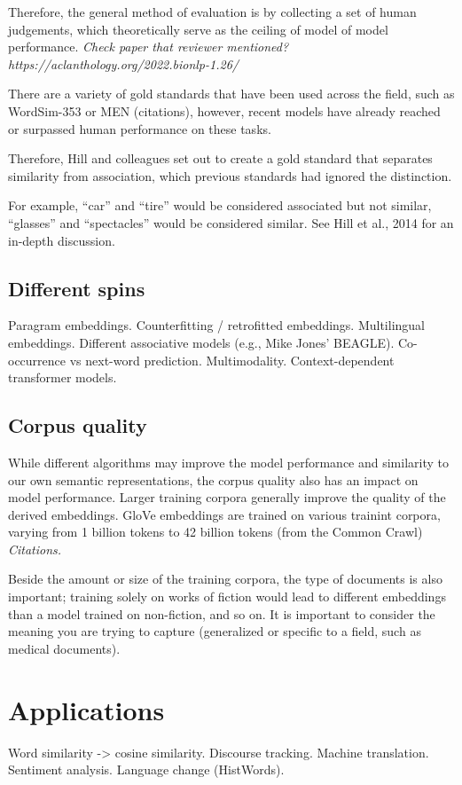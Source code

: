 Therefore, the general method of evaluation is by collecting a set of human judgements, which theoretically serve as the ceiling of model of model performance. \textit{Check paper that reviewer mentioned? https://aclanthology.org/2022.bionlp-1.26/}

There are a variety of gold standards that have been used across the field, such as WordSim-353 or MEN (citations), however, recent models have already reached or surpassed human performance on these tasks.

Therefore, Hill and colleagues set out to create a gold standard that separates similarity from association, which previous standards had ignored the distinction.

For example, ``car'' and ``tire'' would be considered associated but not similar, ``glasses'' and ``spectacles'' would be considered similar. See Hill et al., 2014 for an in-depth discussion.

\subsection{Different spins}

Paragram embeddings.
Counterfitting / retrofitted embeddings.
Multilingual embeddings.
Different associative models (e.g., Mike Jones' BEAGLE).
Co-occurrence vs next-word prediction.
Multimodality.
Context-dependent transformer models.

\subsection{Corpus quality}

While different algorithms may improve the model performance and similarity to our own semantic representations, the corpus quality also has an impact on model performance.
Larger training corpora generally improve the quality of the derived embeddings. 
GloVe embeddings are trained on various trainint corpora, varying from 1 billion tokens to 42 billion tokens (from the Common Crawl) \textit{Citations.}

Beside the amount or size of the training corpora, the type of documents is also important; training solely on works of fiction would lead to different embeddings than a model trained on non-fiction, and so on. It is important to consider the meaning you are trying to capture (generalized or specific to a field, such as medical documents).

\section{Applications}
Word similarity -> cosine similarity.
Discourse tracking.
Machine translation.
Sentiment analysis.
Language change (HistWords).

